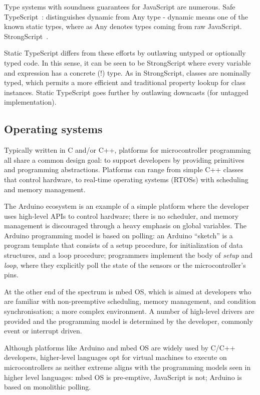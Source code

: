 Type systems with soundness guarantees for JavaScript are numerous. 
Safe TypeScript~\cite{SafeTypeScript15}: distinguishes dynamic from Any type - dynamic means
one of the known static types, where as Any denotes types coming
from raw JavaScript.
StrongScript~\cite{StrongScriptECOOP15}.

Static TypeScript differs from these efforts by outlawing untyped or optionally typed
code.  In this sense, it can be seen to be StrongScript where every variable and 
expression has a concrete (!) type.   As in StrongScript, classes are nominally typed,
which permits a more efficient and traditional property lookup for class instances. 
Static TypeScript goes further by outlawing downcasts (for untagged implementation).


\subsection{Operating systems}

Typically written in C and/or C++, platforms for microcontroller programming all share 
a common design goal: to support developers by providing primitives and programming 
abstractions. Platforms can range from simple C++ classes that control hardware, 
to real-time operating systems (RTOSs) with scheduling and memory management.

The Arduino ecosystem is an example of a simple platform where the developer uses 
high-level APIs to control hardware; there is no scheduler, and memory management 
is discouraged through a heavy emphasis on global variables.  The Arduino programming 
model is based on polling: an Arduino ``sketch'' is a program template that consists 
of a setup procedure, for initialization of data structures, and a loop procedure; 
programmers implement the body of \textit{setup} and \textit{loop}, where they explicitly 
poll the state of the sensors or the microcontroller's pins.

At the other end of the spectrum is mbed OS, which is aimed at developers who are familiar 
with non-preemptive scheduling, memory management, and condition synchronisation; a more 
complex environment. A number of high-level drivers are provided and the programming model 
is determined by the developer, commonly event or interrupt driven.

Although platforms like Arduino and mbed OS are widely used by C/C++ developers, 
higher-level languages opt for virtual machines to execute on microcontrollers 
as neither extreme aligns with the programming models seen in higher level languages: 
mbed OS is pre-emptive, JavaScript is not; Arduino is based on monolithic polling. 

